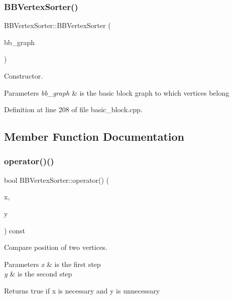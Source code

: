\subsubsection{\texorpdfstring{B\+B\+Vertex\+Sorter()}{BBVertexSorter()}}
{\footnotesize\ttfamily B\+B\+Vertex\+Sorter\+::\+B\+B\+Vertex\+Sorter (\begin{DoxyParamCaption}\item[{const \hyperlink{basic__block_8hpp_ab66bdbde3a29e41d079d8a320af9c921}{B\+B\+Graph\+Const\+Ref}}]{bb\+\_\+graph }\end{DoxyParamCaption})\hspace{0.3cm}{\ttfamily [explicit]}}



Constructor. 


\begin{DoxyParams}{Parameters}
{\em bb\+\_\+graph} & is the basic block graph to which vertices belong \\
\hline
\end{DoxyParams}


Definition at line 208 of file basic\+\_\+block.\+cpp.



\subsection{Member Function Documentation}
\mbox{\label{classBBVertexSorter_a0943b78b2e713d833b00a78e20703588}} 
\subsubsection{\texorpdfstring{operator()()}{operator()()}}
{\footnotesize\ttfamily bool B\+B\+Vertex\+Sorter\+::operator() (\begin{DoxyParamCaption}\item[{const \hyperlink{graph_8hpp_abefdcf0544e601805af44eca032cca14}{vertex}}]{x,  }\item[{const \hyperlink{graph_8hpp_abefdcf0544e601805af44eca032cca14}{vertex}}]{y }\end{DoxyParamCaption}) const}



Compare position of two vertices. 


\begin{DoxyParams}{Parameters}
{\em x} & is the first step \\
\hline
{\em y} & is the second step \\
\hline
\end{DoxyParams}
\begin{DoxyReturn}{Returns}
true if x is necessary and y is unnecessary 
\end{DoxyReturn}


